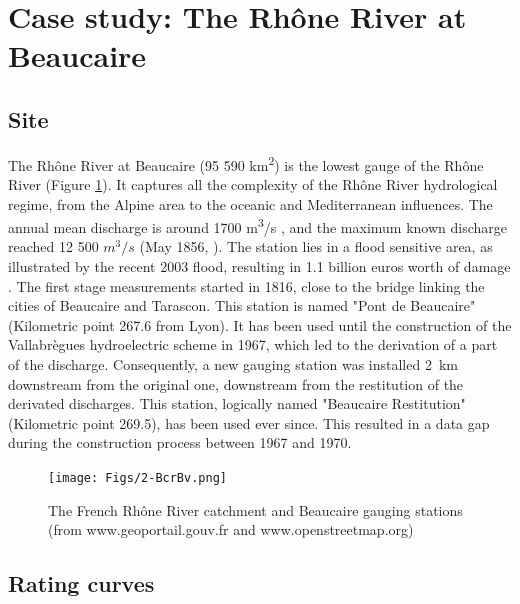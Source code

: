\documentclass[11pt]{article}
\begin{document}
\section{Case study: The Rhône River at Beaucaire}
\label{sec:Bcr}
    \subsection{Site}
    
    The Rhône River at Beaucaire (95 590 km\textsuperscript{2}) is the lowest gauge of the Rhône River (Figure \ref{fig:locstations}). It captures all the complexity of the Rhône River hydrological regime, from the Alpine area to the oceanic and Mediterranean influences. The annual mean discharge is around 1700 m\textsuperscript{3}/s \citep{bard_actualisation_2018}, and the maximum known discharge reached 12 500 $m^3/s$ (May 1856, \citet{lang_les_2014}). The station lies in a flood sensitive area, as illustrated by the recent 2003 flood, resulting in 1.1 billion euros worth of damage \citep{lang_les_2014}. 
    The first stage measurements started in 1816, close to the bridge linking the cities of Beaucaire and Tarascon. This station is named "Pont de Beaucaire" (Kilometric point 267.6 from Lyon). It has been used until the construction of the Vallabrègues hydroelectric scheme in 1967, which led to the derivation of a part of the discharge. Consequently, a new gauging station was installed 2~km downstream from the original one, downstream from the restitution of the derivated discharges. This station, logically named "Beaucaire Restitution" (Kilometric point 269.5), has been used ever since. This resulted in a data gap during the construction process between 1967 and 1970.

    \begin{figure}[h!]
        \centering
        \texttt{[image: Figs/2-BcrBv.png]}
        \caption{The French Rhône River catchment and Beaucaire gauging stations (from www.geoportail.gouv.fr and www.openstreetmap.org)}
        \label{fig:locstations}
    \end{figure}
    
    \subsection{Rating curves}
        \label{sec:prior_elicitation}
        
\end{document}
